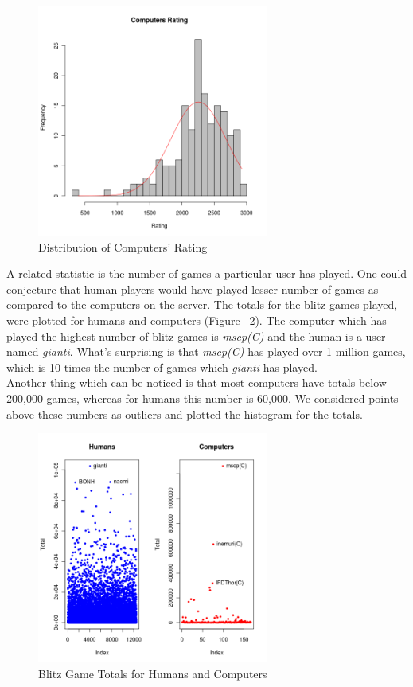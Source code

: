 \documentclass{article}
\begin{document}
\begin{figure} [tph]
\begin{center}
\includegraphics[width=3in]{computers_rating.png}
\end{center}
\caption{Distribution of Computers' Rating}
\label{fig:comprating}
\end{figure}

A related statistic is the number of games a particular user has played. One could conjecture that human players would have played lesser number of games as compared to the computers on the server. The totals for the blitz games played, were plotted for humans and computers (Figure ~\ref{fig:gametotals}). The computer which has played the highest number of blitz games is {\sl mscp(C)} and the human is a user named {\sl gianti}. What's surprising is that {\sl mscp(C)} has played over 1 million games, which is 10 times the number of games which {\sl gianti} has played.\\

Another thing which can be noticed is that most computers have totals below 200,000 games, whereas for humans this number is 60,000. We considered points above these numbers as outliers and plotted the histogram for the totals.

\begin{figure} [tph]
\begin{center}
\includegraphics[width=3in]{game_totals.png}
\end{center}
\caption{Blitz Game Totals for Humans and Computers}
\label{fig:gametotals}
\end{figure}


\pagebreak


\end{document}
